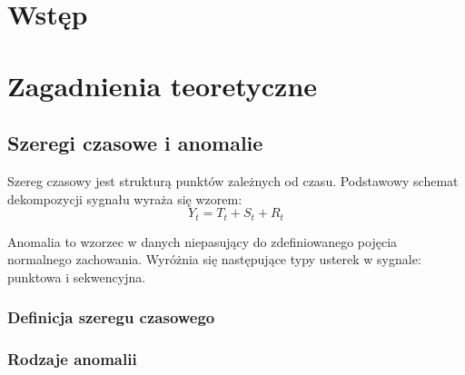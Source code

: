 \documentclass[a4paper,twoside,12pt]{book}
\newcounter{stronyPozaNumeracja}
\begin{document}
\tableofcontents

\setcounter{stronyPozaNumeracja}{\value{page}}
\mainmatter
\pagestyle{empty}

\cleardoublepage

\pagestyle{NumeryStronNazwyRozdzialow}


\chapter{Wstęp}




\chapter{Zagadnienia teoretyczne}

\section{Szeregi czasowe i anomalie}
Szereg czasowy jest strukturą punktów zależnych od czasu. Podstawowy schemat dekompozycji sygnału wyraża się wzorem:
\begin{equation}
	Y_t = T_t + S_t + R_t
\end{equation}

Anomalia to wzorzec w danych niepasujący do zdefiniowanego pojęcia normalnego zachowania. Wyróżnia się następujące typy usterek w sygnale: punktowa i sekwencyjna.
\subsection{Definicja szeregu czasowego}
\subsection{Rodzaje anomalii}
\end{document}
